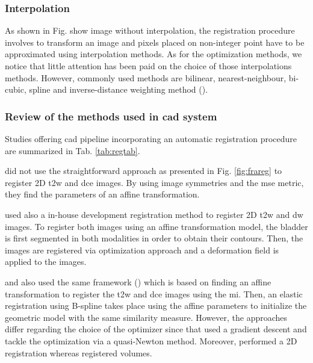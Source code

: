 \subsubsection{Interpolation}\label{subsubsec:int}

As shown in {\color{red} Fig. show image without interpolation}, the registration procedure involves to transform an image and pixels placed on non-integer point have to be approximated using interpolation methods. As for the optimization methods, we notice that little attention has been paid on the choice of those interpolations methods. However, commonly used methods are bilinear, nearest-neighbour, bi-cubic, spline and inverse-distance weighting method (\cite{Mitra2012}).

\subsubsection{Review of the methods used in \ac{cad} system}\label{subsubsec:regrev}

Studies offering \ac{cad} pipeline incorporating an automatic registration procedure are summarized in Tab. \ref{tab:regtab}. 

\cite{Ampeliotis2007,Ampeliotis2008} did not use the straightforward approach as presented in Fig. \ref{fig:frareg} to register 2D \ac{t2w} and \ac{dce} images. By using image symmetries and the \ac{mse} metric, they find the parameters of an affine transformation.

\cite{Giannini2013} used also a in-house development registration method to register 2D \ac{t2w} and \ac{dw} images. To register both images using an affine transformation model, the bladder is first segmented in both modalities in order to obtain their contours. Then, the images are registered via optimization approach and a deformation field is applied to the images.

\cite{Giannini2013} and also \cite{Vos2010} used the same framework (\cite{Rueckert1999}) which is based on finding an affine transformation to register the \ac{t2w} and \ac{dce} images using the \ac{mi}. Then, an elastic registration using B-spline takes place using the affine parameters to initialize the geometric model with the  same similarity measure. However, the approaches differ regarding the choice of the optimizer since that \cite{Giannini2013} used a gradient descent and \cite{Vos2010} tackle the optimization via a quasi-Newton method. Moreover, \cite{Giannini2013} performed a 2D registration whereas \cite{Vos2010} registered volumes.

